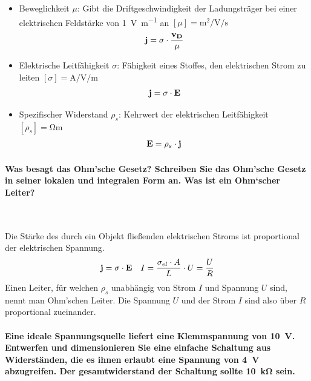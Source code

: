 \documentclass[a4paper, 11pt, ngerman, parskip=half-]{scrartcl}
\begin{document}
\begin{itemize}
    \item Beweglichkeit $\mu$: Gibt die Driftgeschwindigkeit der Ladungsträger bei einer
          elektrischen Feldstärke von \SI{1}{\V\per\m} an $[\mu] = \si{\m\squared\per\V\per\s}$
          \begin{equation}
              \bold{j} = \sigma \cdot \frac{\bold{v_D}}{\mu}
          \end{equation}

    \item Elektrische Leitfähigkeit $\sigma$: Fähigkeit eines Stoffes, den elektrischen Strom zu
          leiten $[\sigma] = \si{\A\per\V\per\m}$
          \begin{equation}
              \bold{j} = \sigma \cdot \bold{E}
          \end{equation}

    \item Spezifischer Widerstand $\rho_s$: Kehrwert der elektrischen Leitfähigkeit
          $[\rho_s] = \si{\ohm\m}$
          \begin{equation}
              \bold{E} = \rho_s \cdot \bold{j}
          \end{equation}
\end{itemize}

\paragraph{Was besagt das Ohm'sche Gesetz? Schreiben Sie das Ohm'sche Gesetz in seiner lokalen und
    integralen Form an. Was ist ein Ohm‘scher Leiter?} ~

Die Stärke des durch ein Objekt fließenden elektrischen Stroms ist proportional der elektrischen
Spannung.
\begin{equation}
    \bold{j} = \sigma \cdot \bold{E} ~~~ I = \frac{\sigma_{el} \cdot A}{L} \cdot U = \frac{U}{R}
\end{equation}
Einen Leiter, für welchen $\rho_s$ unabhängig von Strom $I$ und Spannung $U$ sind, nennt man
Ohm'schen Leiter. Die Spannung $U$ und der Strom $I$ sind also über $R$ proportional zueinander.

\paragraph{Eine ideale Spannungsquelle liefert eine Klemmspannung von \SI{10}{\V}. Entwerfen und
    dimensionieren Sie eine einfache Schaltung aus Widerständen, die es ihnen erlaubt eine Spannung von
    \SI{4}{\V} abzugreifen. Der gesamtwiderstand der Schaltung sollte \SI{10}{\kilo\ohm} sein.}
\end{document}
